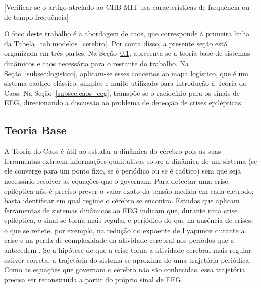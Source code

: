 \documentclass[]{article}
\begin{document}
	[Verificar se o artigo atrelado ao CHB-MIT \cite{shoeb2009application} usa características de frequência ou de tempo-frequência]

	O foco deste trabalho é a abordagem de caos, que corresponde à primeira linha da Tabela~\ref{tab:modelos_cerebro}. Por conta disso, a presente seção está organizada em três partes. Na Seção~\ref{subsec:teoria_base}, apresenta-se a teoria base de sistemas dinâmicos e caos necessária para o restante do trabalho. Na Seção~\ref{subsec:logistico}, aplicam-se esses conceitos ao mapa logístico, que é um sistema caótico clássico, simples e muito utilizado para introdução à Teoria do Caos. Na Seção~\ref{subsec:caos_eeg}, transpõe-se o raciocínio para os sinais de EEG, direcionando a discussão ao problema de detecção de crises epilépticas.

	\subsection{Teoria Base}
	\label{subsec:teoria_base}
	\noindent

	A Teoria do Caos é útil ao estudar a dinâmica do cérebro pois as suas ferramentas extraem informações qualitativas sobre a dinâmica de um sistema (se ele converge para um ponto fixo, se é periódico ou se é caótico) sem que seja necessário resolver as equações que o governam. Para detectar uma crise epiléptica não é preciso prever o valor exato da tensão medida em cada eletrodo; basta identificar em qual regime o cérebro se encontra. Estudos que aplicam ferramentas de sistemas dinâmicos ao EEG indicam que, durante uma crise epiléptica, o sinal se torna mais regular e periódico do que na ausência de crises, o que se reflete, por exemplo, na redução do expoente de Lyapunov durante a crise \cite{iasemidis1990phase} e na perda de complexidade da atividade cerebral nos períodos que a antecedem \cite{lehnertz1998can}. Se a hipótese de que a crise torna a atividade cerebral mais regular estiver correta, a trajetória do sistema se aproxima de uma trajetória periódica. Como as equações que governam o cérebro não são conhecidas, essa trajetória precisa ser reconstruída a partir do próprio sinal de EEG.
\end{document}
